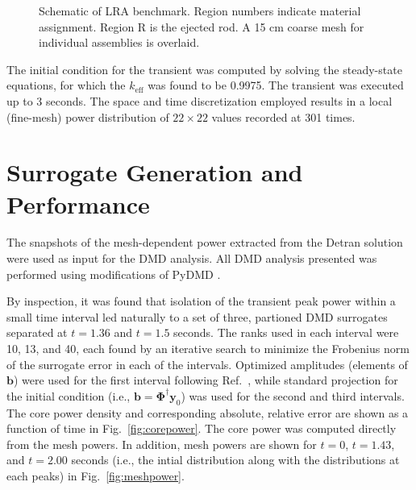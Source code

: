 \documentclass{anstrans}
\begin{document}
\begin{figure}
\caption{Schematic of LRA benchmark.  Region numbers indicate material assignment.  Region R is the  ejected rod.  A 15 cm coarse mesh for individual assemblies is overlaid.}
\label{fig:lra_core}
\end{figure}

The initial condition for the transient was computed by solving the steady-state equations, for which the $k_{\text{eff}}$ was found to be 0.9975.
The transient was executed up to 3 seconds.
The space and time discretization employed results in a local (fine-mesh) power distribution of $22 \times 22$ values recorded at 301 times.


\section{Surrogate Generation and Performance}

The snapshots of the mesh-dependent power extracted from the Detran solution were used as input for the DMD analysis. All DMD analysis presented was performed using modifications of  PyDMD \cite{demo2018pydmd}.
 
By inspection, it was found that isolation of the transient peak power within a small time interval led naturally to a set of three, partioned DMD surrogates separated at $t = 1.36$ and $t = 1.5$ seconds.  The ranks used in each interval were 10, 13, and 40, each found by an iterative search to minimize the Frobenius norm of the surrogate error in each of the intervals.  Optimized amplitudes (elements of $\mathbf{b}$) were used for the first interval following Ref.~\cite{jovanovic2014sparsity}, while standard projection for the initial condition (i.e., $\mathbf{b}=\bm{\Phi}^{\dagger} \mathbf{y}_0$) was used for the second and third intervals.    The core power density and corresponding absolute, relative error are shown as a function of time in Fig.~\ref{fig:corepower}.  The core power was computed directly from the mesh powers. In addition, mesh powers are shown for $t=0$, $t=1.43$, and $t=2.00$ seconds (i.e., the intial distribution along with the distributions at each peaks) in Fig.~\ref{fig:meshpower}.  
\end{document}
